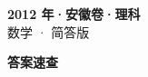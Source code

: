 \documentclass[zihao=-4, a4paper]{ctexart}
\begin{document}
\begin{center}
  {\Large\bfseries 2012 年·安徽卷·理科}\\[4pt]
  {\large 数学 · 简答版}
\end{center}
\medskip
{}

\clearpage
{}
\begin{center}{\Large\bfseries 答案速查}\end{center}
\medskip

\end{document}
